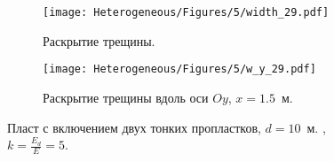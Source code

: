 \begin{figure}[htbp]
    \centering
    \begin{subfigure}[t]{0.4\textwidth}
        \centering
        \texttt{[image: Heterogeneous/Figures/5/width\_29.pdf]}
        \caption{Раскрытие трещины.}
    \end{subfigure}
    \hfill 
    \begin{subfigure}[t]{0.55\textwidth}
        \centering
        \texttt{[image: Heterogeneous/Figures/5/w\_y\_29.pdf]}
        \caption{Раскрытие трещины вдоль оси $Oy$, $x=1.5$~м.}
    \end{subfigure}
    \caption{Пласт с включением двух тонких пропластков, $d=10$~м. , $k=\frac{E_d}{E}=5$.}
    \label{fig:thin-layer-2}
\end{figure}